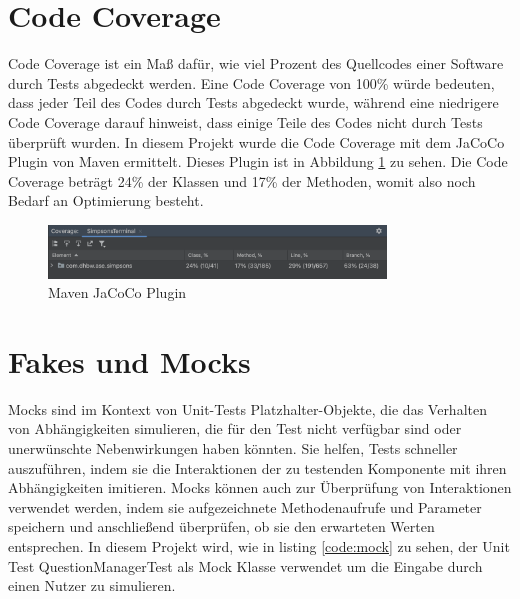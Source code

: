 \section{Code Coverage}
Code Coverage ist ein Maß dafür, wie viel Prozent des Quellcodes einer Software durch Tests abgedeckt werden. Eine Code Coverage von 100\% würde bedeuten, dass jeder Teil des Codes durch Tests abgedeckt wurde, während eine  niedrigere Code Coverage darauf hinweist, dass einige Teile des Codes nicht durch Tests überprüft wurden. In diesem Projekt wurde die Code Coverage mit dem JaCoCo Plugin von Maven ermittelt. Dieses Plugin ist in Abbildung \ref{fig:jacoco} zu sehen. Die Code Coverage beträgt 24\% der Klassen und 17\% der Methoden, womit also noch Bedarf an Optimierung besteht.
\begin{figure}[ht]
    \centering
    \includegraphics[width=0.8\textwidth]{Bilder/coverage.png}
    \caption{Maven JaCoCo Plugin}
    \label{fig:jacoco}
\end{figure}
\newpage

\section{Fakes und Mocks}
Mocks sind im Kontext von Unit-Tests Platzhalter-Objekte, die das Verhalten von Abhängigkeiten simulieren, die für den Test nicht verfügbar sind oder unerwünschte Nebenwirkungen haben könnten. Sie helfen, Tests schneller auszuführen, indem sie die Interaktionen der zu testenden Komponente mit ihren Abhängigkeiten imitieren. Mocks können auch zur Überprüfung von Interaktionen verwendet werden, indem sie aufgezeichnete Methodenaufrufe und Parameter speichern und anschließend überprüfen, ob sie den erwarteten Werten entsprechen. In diesem Projekt wird, wie in listing \ref{code:mock} zu sehen, der Unit Test QuestionManagerTest als Mock Klasse verwendet um die Eingabe durch einen Nutzer zu simulieren. 


